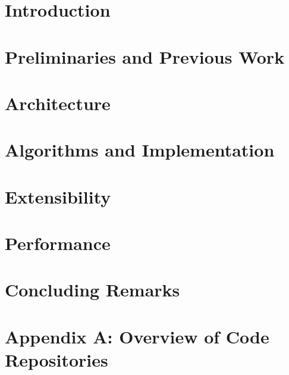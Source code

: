 \documentclass[12pt]{report}
\begin{document}
\setcounter{page}{0}
\chapter{Introduction}


\chapter{Preliminaries and Previous Work}


\chapter{Architecture}
\label{chap:arch}


\chapter{Algorithms and Implementation}
\label{chap:algoimp}

\chapter{Extensibility}
\label{chap:extensible}

\chapter{Performance}

\chapter{Concluding Remarks}
\label{chap:conclusion}


\chapter*{Appendix A: Overview of Code Repositories}




\end{document}
